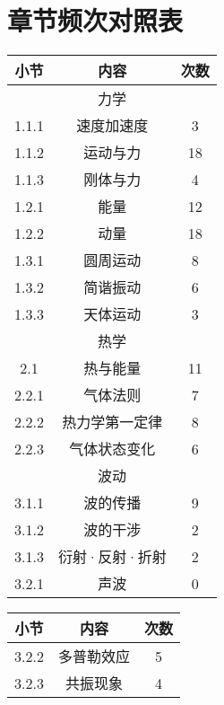 \section{章节频次对照表}

\begin{center}
    \renewcommand\arraystretch{1.2}
    \begin{minipage}{0.48\textwidth}
        \centering
        \begin{tabular}{c|c|c}
            \hline
            小节&内容&次数\\\hline
            \multicolumn{3}{c}{力学}\\\hline
            1.1.1&速度加速度&3\\\hline
            1.1.2&运动与力&18\\\hline
            1.1.3&刚体与力&4\\\hline
            1.2.1&能量&12\\\hline
            1.2.2&动量&18\\\hline
            1.3.1&圆周运动&8\\\hline
            1.3.2&简谐振动&6\\\hline
            1.3.3&天体运动&3\\\hline
            \multicolumn{3}{c}{热学}\\\hline
            2.1&热与能量&11\\\hline
            2.2.1&气体法则&7\\\hline
            2.2.2&热力学第一定律&8\\\hline
            2.2.3&气体状态变化&6\\\hline
            \multicolumn{3}{c}{波动}\\\hline
            3.1.1&波的传播&9\\\hline
            3.1.2&波的干涉&2\\\hline
            3.1.3&衍射·反射·折射&2\\\hline
            3.2.1&声波&0\\\hline
        \end{tabular}
    \end{minipage}
    \begin{minipage}{0.48\textwidth}
        \centering
        \begin{tabular}{c|c|c}
            \hline
            小节&内容&次数\\\hline
            3.2.2&多普勒效应&5\\\hline
            3.2.3&共振现象&4\\\hline

\end{tabular}
\end{minipage}
\end{center}
